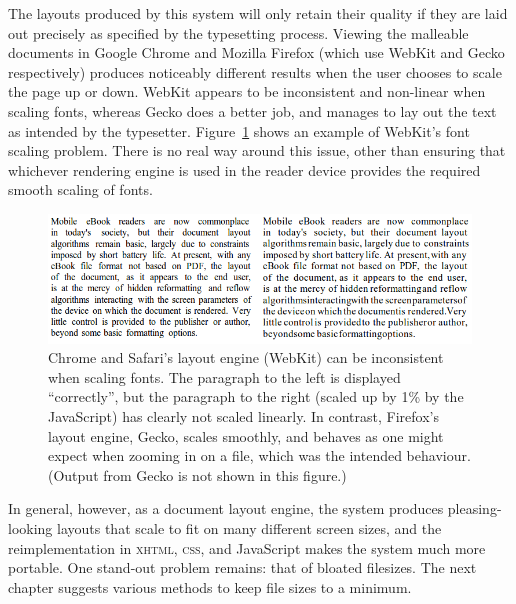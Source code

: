 The layouts produced by this system will only retain their quality if they are laid out precisely as specified by the typesetting process. Viewing the malleable documents in Google Chrome and Mozilla Firefox (which use WebKit and Gecko respectively) produces noticeably different results when the user chooses to scale the page up or down. WebKit appears to be inconsistent and non-linear when scaling fonts, whereas Gecko does a better job, and manages to lay out the text as intended by the typesetter. Figure~\ref{fig:craprenderer} shows an example of WebKit's font scaling problem. There is no real way around this issue, other than ensuring that whichever rendering engine is used in the reader device provides the required smooth scaling of fonts.

\begin{figure}
    \includegraphics[width=\textwidth]{gfx/webkitisshit}
    \caption[Inconsistent font scaling by WebKit]{Chrome and Safari's layout engine (WebKit) can be inconsistent when scaling fonts. The paragraph to the left is displayed ``correctly'', but the paragraph to the right (scaled up by 1\% by the JavaScript) has clearly not scaled linearly. In contrast, Firefox's layout engine, Gecko, scales smoothly, and behaves as one might expect when zooming in on a \pdf{} file, which was the intended behaviour. (Output from Gecko is not shown in this figure.)}
    \label{fig:craprenderer}
\end{figure}


In general, however, as a document layout engine, the system produces pleasing-looking layouts that scale to fit on many different screen sizes, and the reimplementation in \textsc{xhtml}, \textsc{css}, and JavaScript makes the system much more portable. One stand-out problem remains: that of bloated filesizes. The next chapter suggests various methods to keep file sizes to a minimum.





